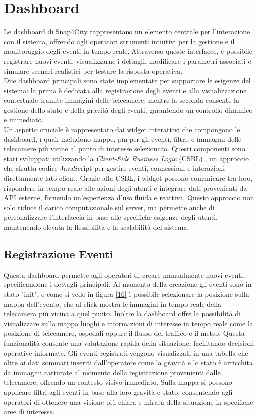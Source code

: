 \documentclass[a4paper, openright, thesis]{report}
\begin{document}
\section{Dashboard} \label{dashboard}
Le dashboard di Snap4City rappresentano un elemento centrale per l’interazione con il sistema, offrendo agli operatori strumenti intuitivi per la gestione e il monitoraggio degli eventi in tempo reale. Attraverso queste interfacce, è possibile registrare nuovi eventi, visualizzarne i dettagli, modificare i parametri associati e simulare scenari realistici per testare la risposta operativa.\\
Due dashboard principali sono state implementate per supportare le esigenze del sistema: la prima è dedicata alla registrazione degli eventi e alla visualizzazione contestuale tramite immagini delle telecamere, mentre la seconda consente la gestione dello stato e della gravità degli eventi, garantendo un controllo dinamico e immediato. \\
Un aspetto cruciale è rappresentato dai widget interattivi che compongono le dashboard, i quali includono mappe, pin per gli eventi, filtri, e immagini delle telecamere più vicine al punto di interesse selezionato. Questi componenti sono stati sviluppati utilizzando la \textit{Client-Side Business Logic} (CSBL) \cite{CSBL}, un approccio che sfrutta codice JavaScript per gestire eventi, connessioni e interazioni direttamente lato client. Grazie alla CSBL, i widget possono comunicare tra loro, rispondere in tempo reale alle azioni degli utenti e integrare dati provenienti da API esterne, fornendo un’esperienza d’uso fluida e reattiva. Questo approccio non solo riduce il carico computazionale sul server, ma permette anche di personalizzare l'interfaccia in base alle specifiche esigenze degli utenti, mantenendo elevata la flessibilità e la scalabilità del sistema.
\subsection{Registrazione Eventi} \label{regevent}

Questa dashboard permette agli operatori di creare manualmente nuovi eventi, specificandone i dettagli principali.
Al momento della creazione gli eventi sono in stato "init", e come si vede in figura \ref{16} è possibile selezionare la posizione sulla mappa dell'evento, che al click mostra le immagini in tempo reale della telecamera più vicina a quel punto. Inoltre la dashboard offre la possibilità di visualizzare sulla mappa luoghi e informazioni di interesse in tempo reale come la posizione di telecamere, ospedali oppure il flusso del traffico e il meteo. Questa funzionalità consente una valutazione rapida della situazione, facilitando decisioni operative informate.
Gli eventi registrati vengono visualizzati in una tabella che oltre ai dati sommari inseriti dall'operatore come la gravità e lo stato è arricchita da immagini catturate al momento della registrazione provenienti dalle telecamere, offrendo un contesto visivo immediato. Sulla mappa si possono applicare filtri agli eventi in base alla loro gravità e stato, consentendo agli operatori di ottenere una visione più chiara e mirata della situazione in specifiche aree di interesse.
\end{document}

